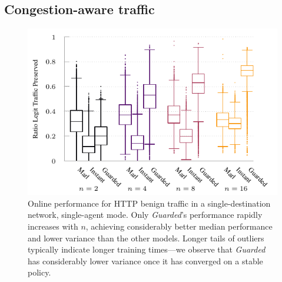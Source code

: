 \documentclass[10pt, times, conference, letterpaper]{IEEEtran}
\begin{document}
\subsection{Congestion-aware traffic}
%	
\begin{figure}
	\centering
	\includegraphics[width=0.9\linewidth]{../plots/tnsm-tcp-box-single}
	
	\caption{
		Online performance for HTTP benign traffic in a single-destination network, single-agent mode.
		Only \emph{Guarded}'s performance rapidly increases with $n$, achieving considerably better median performance and lower variance than the other models.
		Longer tails of outliers typically indicate longer training times---we observe that \emph{Guarded} has considerably lower variance once it has converged on a stable policy.
		\vspace{-1em}
		\label{fig:tcp-tree-box}
	}
\end{figure}
%	
\end{document}
